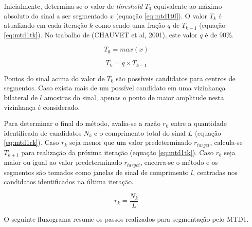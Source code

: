 \documentclass[
	12pt,				%
	openright,			%
	oneside,
	a4paper,			%
	english,			%
	francais,			%
	spanish,			%
	brazil				%
	]{abntex2}
\begin{document}
	Inicialmente, determina-se o valor de \emph{threshold} $T_0$ equivalente ao máximo absoluto do sinal a ser segmentado $x$ (equação \ref{eq:mtd1t0}). O valor $T_k$ é atualizado em cada iteração $k$ como sendo uma fração $q$ de $T_{k-1}$ (equação \ref{eq:mtd1tk}). No trabalho de (CHAUVET et al, 2001), este valor $q$ é de 90\%.
	
\begin{equation}
\label{eq:mtd1t0}
  T_0 = max(x)
\end{equation}

\begin{equation}
\label{eq:mtd1tk}
  T_k = q \times T_{k-1}
\end{equation}

	Pontos do sinal acima do valor de $T_k$ são possíveis candidatos para centros de segmentos. Caso exista mais de um possível candidato em uma vizinhança bilateral de $l$ amostras do sinal, apenas o ponto de maior amplitude nesta vizinhança é considerado.
	
	Para determinar o final do método, avalia-se a razão $r_k$ entre a quantidade identificada de candidatos $N_{k}$ e o comprimento total do sinal $L$ (equação \ref{eq:mtd1rk}). Caso $r_k$ seja menor que um valor predeterminado $r_{target}$, calcula-se $T_{k+1}$ para realização da próxima iteração (equação \ref{eq:mtd1tk}). Caso $r_k$ seja maior ou igual ao valor predeterminado $r_{target}$, encerra-se o método e os segmentos são tomados como janelas de sinal de comprimento $l$, centradas nos candidatos identificados na última iteração.
	
\begin{equation}
\label{eq:mtd1rk}
  r_k = \frac{N_{k}}{L} 
\end{equation}
	
	O seguinte fluxograma resume os passos realizados para segmentação pelo MTD1.
	
	
\end{document}
